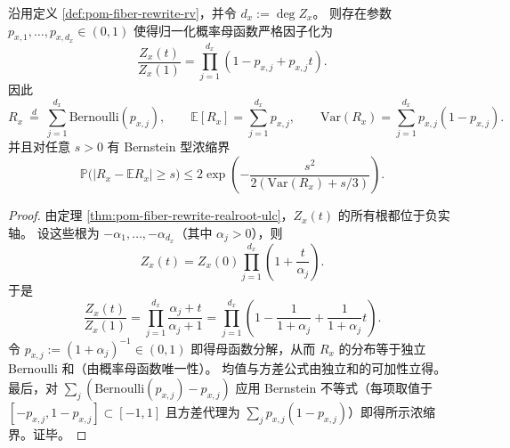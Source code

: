 \begin{corollary}\label{cor:pom-fiber-rewrite-poisson-binomial}
沿用定义 \ref{def:pom-fiber-rewrite-rv}，并令 \(d_x:=\deg Z_x\)。
则存在参数 \(p_{x,1},\dots,p_{x,d_x}\in(0,1)\) 使得归一化概率母函数严格因子化为
\[
\frac{Z_x(t)}{Z_x(1)}=\prod_{j=1}^{d_x}(1-p_{x,j}+p_{x,j}t).
\]
因此
\[
R_x\ \overset{d}{=}\ \sum_{j=1}^{d_x}\mathrm{Bernoulli}(p_{x,j}),
\qquad
\mathbb{E}[R_x]=\sum_{j=1}^{d_x} p_{x,j},
\qquad
\mathrm{Var}(R_x)=\sum_{j=1}^{d_x}p_{x,j}(1-p_{x,j}).
\]
并且对任意 \(s>0\) 有 Bernstein 型浓缩界
\[
\mathbb{P}\bigl(|R_x-\mathbb{E}R_x|\ge s\bigr)
\le 2\exp\!\left(-\frac{s^2}{2(\mathrm{Var}(R_x)+s/3)}\right).
\]
\end{corollary}
\begin{proof}
由定理 \ref{thm:pom-fiber-rewrite-realroot-ulc}，\(Z_x(t)\) 的所有根都位于负实轴。
设这些根为 \(-\alpha_1,\dots,-\alpha_{d_x}\)（其中 \(\alpha_j>0\)），则
\[
Z_x(t)=Z_x(0)\prod_{j=1}^{d_x}\left(1+\frac{t}{\alpha_j}\right).
\]
于是
\[
\frac{Z_x(t)}{Z_x(1)}
=\prod_{j=1}^{d_x}\frac{\alpha_j+t}{\alpha_j+1}
=\prod_{j=1}^{d_x}\left(1-\frac{1}{1+\alpha_j}+\frac{1}{1+\alpha_j}t\right).
\]
令 \(p_{x,j}:=(1+\alpha_j)^{-1}\in(0,1)\) 即得母函数分解，从而 \(R_x\) 的分布等于独立 Bernoulli 和（由概率母函数唯一性）。
均值与方差公式由独立和的可加性立得。
最后，对 \(\sum_j(\mathrm{Bernoulli}(p_{x,j})-p_{x,j})\) 应用 Bernstein 不等式（每项取值于 \([-p_{x,j},1-p_{x,j}]\subset[-1,1]\) 且方差代理为 \(\sum_j p_{x,j}(1-p_{x,j})\)）即得所示浓缩界。证毕。
\end{proof}

